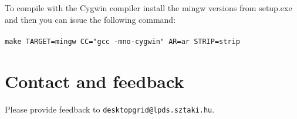 \documentclass[a4paper,12pt,titlepage,dvipdfm]{article}
\begin{document}
To compile with the Cygwin compiler install the mingw versions from setup.exe                                                                                                                                                              
and then you can issue the following command:                                                                                                                                                                                              
\\
\\                                                                                                                                                                                                                                           
\texttt{make TARGET=mingw CC="gcc -mno-cygwin" AR=ar STRIP=strip}

\pagebreak 

\section{Contact and feedback}

Please provide feedback to \texttt{desktopgrid@lpds.sztaki.hu}.
\end{document}
